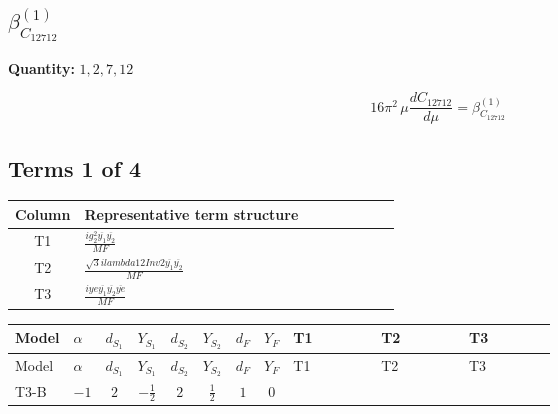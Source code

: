 \documentclass[8pt]{article}
\begin{document}
\begin{landscape}
\section*{$\beta_{C_{12712}}^{(1)}$}
\noindent\textbf{Quantity: }$\mathrm{1,2,7,12}$\par\smallskip
\[16\pi^2\,\mu\frac{d C_{12712}}{d\mu}=\beta_{C_{12712}}^{(1)}\]
\subsection*{Terms 1 of 4}
\begin{center}
\begin{tabular}{@{}c >{\raggedright\arraybackslash}p{0.82\linewidth}@{}}
\toprule
Column & Representative term structure \\
\midrule
T1 & \(\displaystyle \frac{i g_{2}^{2} \overline{y_{1}} \overline{y_{2}}}{MF}\) \\
\midrule
T2 & \(\displaystyle \frac{\sqrt{3} i lambda12Inv2 \overline{y_{1}} \overline{y_{2}}}{MF}\) \\
\midrule
T3 & \(\displaystyle \frac{i ye \overline{y_{1}} \overline{y_{2}} \overline{ye}}{MF}\) \\
\midrule
\bottomrule
\end{tabular}
\end{center}
\smallskip
\tiny
\begin{longtable}{@{}llcccccc >{\raggedright\arraybackslash}p{0.21\linewidth} >{\raggedright\arraybackslash}p{0.21\linewidth} >{\raggedright\arraybackslash}p{0.21\linewidth}@{}}
\toprule
Model & $\alpha$ & $d_{S_1}$ & $Y_{S_1}$ & $d_{S_2}$ & $Y_{S_2}$ & $d_F$ & $Y_F$ & T1 & T2 & T3 \\
\midrule
\endfirsthead
\toprule
Model & $\alpha$ & $d_{S_1}$ & $Y_{S_1}$ & $d_{S_2}$ & $Y_{S_2}$ & $d_F$ & $Y_F$ & T1 & T2 & T3 \\
\midrule
\endhead
T3-B & $-1$ & $2$ & $-\frac{1}{2}$ & $2$ & $\frac{1}{2}$ & $1$ & $0$ & \scriptsize\adjustbox{max width=\linewidth}{$\begin{gathered} - \frac{3 i g_{2}^{2} \overline{y_{1}} \overline{y_{2}}}{8 MF}\end{gathered}$} & \scriptsize\adjustbox{max width=\linewidth}{$\begin{gathered} - \frac{\sqrt{3} i lambda12Inv2 \overline{y_{1}} \overline{y_{2}}}{6 MF}\end{gathered}$} & \scriptsize\adjustbox{max width=\linewidth}{$\begin{gathered} \frac{i ye \overline{y_{1}} \overline{y_{2}} \overline{ye}}{8 MF}\end{gathered}$} \\

\end{longtable}
\end{landscape}
\end{document}
